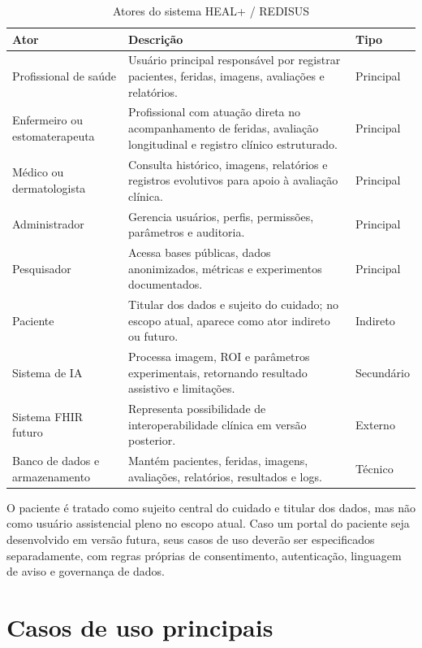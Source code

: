 \documentclass[
    12pt,
    oneside,
    a4paper,
    chapter=TITLE,
    brazil,
    sumario=tradicional,
    hidelinks
]{abntex2}
\begin{document}
\begin{table}[htbp]
    \centering
    \caption{\label{tab:atores-engenharia}Atores do sistema HEAL+ / REDISUS}
    \begin{tabular}{L{4.2cm}L{7.2cm}L{2.1cm}}
        \toprule
        \textbf{Ator} & \textbf{Descrição} & \textbf{Tipo} \\
        \midrule
        Profissional de saúde & Usuário principal responsável por registrar pacientes, feridas, imagens, avaliações e relatórios. & Principal \\
        Enfermeiro ou estomaterapeuta & Profissional com atuação direta no acompanhamento de feridas, avaliação longitudinal e registro clínico estruturado. & Principal \\
        Médico ou dermatologista & Consulta histórico, imagens, relatórios e registros evolutivos para apoio à avaliação clínica. & Principal \\
        Administrador & Gerencia usuários, perfis, permissões, parâmetros e auditoria. & Principal \\
        Pesquisador & Acessa bases públicas, dados anonimizados, métricas e experimentos documentados. & Principal \\
        Paciente & Titular dos dados e sujeito do cuidado; no escopo atual, aparece como ator indireto ou futuro. & Indireto \\
        Sistema de IA & Processa imagem, ROI e parâmetros experimentais, retornando resultado assistivo e limitações. & Secundário \\
        Sistema FHIR futuro & Representa possibilidade de interoperabilidade clínica em versão posterior. & Externo \\
        Banco de dados e armazenamento & Mantém pacientes, feridas, imagens, avaliações, relatórios, resultados e logs. & Técnico \\
        \bottomrule
    \end{tabular}
\end{table}

O paciente é tratado como sujeito central do cuidado e titular dos dados, mas não como usuário assistencial pleno no escopo atual. Caso um portal do paciente seja desenvolvido em versão futura, seus casos de uso deverão ser especificados separadamente, com regras próprias de consentimento, autenticação, linguagem de aviso e governança de dados.

\section{Casos de uso principais}
\end{document}
